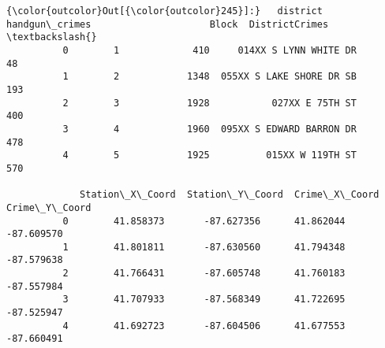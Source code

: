 \documentclass[11pt]{article}
\begin{document}
\begin{Verbatim}[commandchars=\\\{\}]
{\color{outcolor}Out[{\color{outcolor}245}]:}   district  handgun\_crimes                     Block  DistrictCrimes  \textbackslash{}
          0        1             410     014XX S LYNN WHITE DR              48   
          1        2            1348  055XX S LAKE SHORE DR SB             193   
          2        3            1928           027XX E 75TH ST             400   
          3        4            1960  095XX S EDWARD BARRON DR             478   
          4        5            1925          015XX W 119TH ST             570   
          
             Station\_X\_Coord  Station\_Y\_Coord  Crime\_X\_Coord  Crime\_Y\_Coord  
          0        41.858373       -87.627356      41.862044     -87.609570  
          1        41.801811       -87.630560      41.794348     -87.579638  
          2        41.766431       -87.605748      41.760183     -87.557984  
          3        41.707933       -87.568349      41.722695     -87.525947  
          4        41.692723       -87.604506      41.677553     -87.660491  
\end{Verbatim}
            
\end{document}
